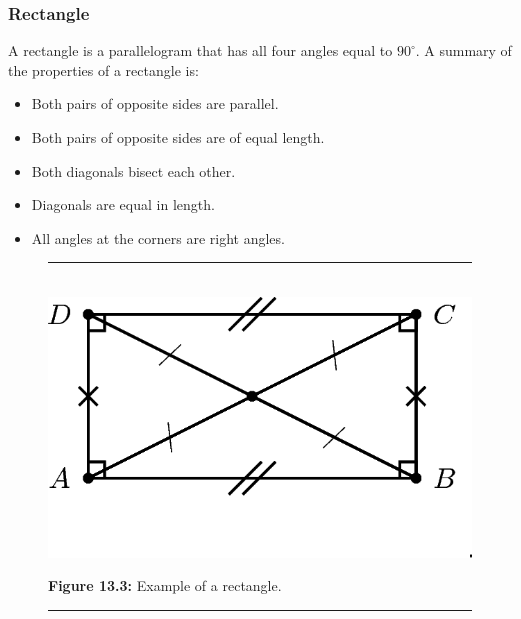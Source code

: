 \subsubsection{ Rectangle}
A rectangle is a parallelogram that has all four angles equal to ${90}^{\circ
}$. A summary of the properties of a rectangle is:\par 
\begin{itemize}[noitemsep]
\item Both pairs of opposite sides are parallel.
\item Both pairs of opposite sides are of equal length.
\item Both diagonals bisect each other.
\item Diagonals are equal in length.
\item All angles at the corners are right angles.
\end{itemize}
\setcounter{subfigure}{0}
\begin{figure}[H] %
\begin{center}
\rule[.1in]{\figurerulewidth}{.005in} \\
\label{m39354*uid68!!!underscore!!!media}\label{
m39354*uid68!!!underscore!!!printimage}\includegraphics{
col11306.imgs/m39354_MG10C13_042.png} %
\vspace{2pt}
\vspace{\rubberspace}\par \begin{cnxcaption}
\small \textbf{Figure 13.3: }Example of a rectangle.
\end{cnxcaption}
\vspace{.1in}
\rule[.1in]{\figurerulewidth}{.005in} \\
\end{center}
\end{figure}       

